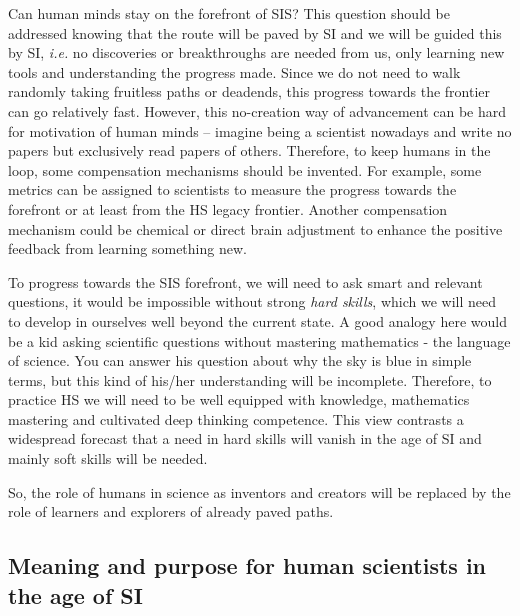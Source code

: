 \documentclass[a4paper,11pt]{article}
\begin{document}
        Can human minds stay on the forefront of SIS? This question should be addressed knowing that the route will be paved by SI and we will be guided this by SI, \emph{i.e.} no discoveries or breakthroughs are needed from us, only learning new tools and understanding the progress made. Since we do not need to walk randomly taking fruitless paths or deadends, this progress towards the frontier can go relatively fast. However, this no-creation way of advancement can be hard for motivation of human minds -- imagine being a scientist nowadays and write no papers but exclusively read papers of others. Therefore, to keep humans in the loop, some compensation mechanisms should be invented. For example, some metrics can be assigned to scientists to measure the progress towards the forefront or at least from the HS legacy frontier. Another compensation mechanism could be chemical or direct brain adjustment to enhance the positive feedback from learning something new.
        
        To progress towards the SIS forefront, we will need to ask smart and relevant questions, it would be impossible without strong \emph{hard skills}, which we will need to develop in ourselves well beyond the current state. A good analogy here would be a kid asking scientific questions without mastering mathematics - the language of science. You can answer his question about why the sky is blue in simple terms, but this kind of his/her understanding will be incomplete. Therefore, to practice HS we will need to be well equipped with knowledge, mathematics mastering and cultivated deep thinking competence. This view contrasts a widespread forecast that a need in hard skills will vanish in the age of SI and mainly soft skills will be needed.

        So, the role of humans in science as inventors and creators will be replaced by the role of learners and explorers of already paved paths.

    \subsection{Meaning and purpose for human scientists in the age of SI}
\end{document}
